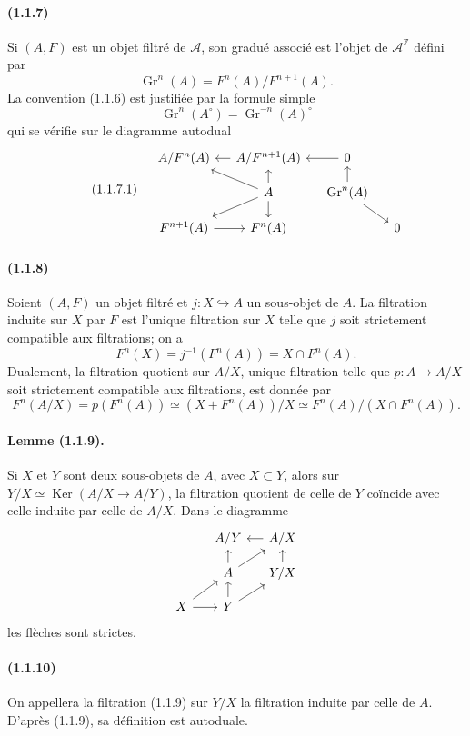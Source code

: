 \documentclass[10pt]{article}
\newcommand{\Z}{\mathbb Z}
\newcommand{\Gr}{\operatorname{Gr}}
\newcommand{\Ker}{\operatorname{Ker}}
\newcommand{\calA}{\mathcal A}
\begin{document}
\paragraph{(1.1.7)} Si $(A,F)$ est un objet filtré de $\calA$, son gradué associé est l'objet de $\calA^{\Z}$ défini par
\[
\Gr^n(A)=F^n(A)/F^{n+1}(A).
\]
La convention (1.1.6) est justifiée par la formule simple
\[
\Gr^n(A^{\circ})=\Gr^{-n}(A)^{\circ}
\]
qui se vérifie sur le diagramme autodual
\begin{equation}\tag{1.1.7.1}
\begin{tikzcd}[column sep=1.2em,row sep=1.0em]
& A/F^n(A) & A/F^{n+1}(A) \arrow[l] & 0 \arrow[l] \\
& & A \arrow[ul] \arrow[u] \arrow[dl] \arrow[d] & \Gr^n(A) \arrow[u] \arrow[dr] \\
& F^{n+1}(A) \arrow[r] & F^n(A) & & 0
\end{tikzcd}
\end{equation}

\paragraph{(1.1.8)} Soient $(A,F)$ un objet filtré et $j:X\hookrightarrow A$ un sous-objet de $A$. La filtration induite sur $X$ par $F$ est l'unique filtration sur $X$ telle que $j$ soit strictement compatible aux filtrations; on a
\[
F^n(X)=j^{-1}(F^n(A))=X\cap F^n(A).
\]
Dualement, la filtration quotient sur $A/X$, unique filtration telle que $p:A\to A/X$ soit strictement compatible aux filtrations, est donnée par
\[
F^n(A/X)=p(F^n(A))\simeq (X+F^n(A))/X\simeq F^n(A)/(X\cap F^n(A)).
\]

\paragraph{Lemme (1.1.9).} Si $X$ et $Y$ sont deux sous-objets de $A$, avec $X\subset Y$, alors sur $Y/X\simeq\Ker(A/X\to A/Y)$, la filtration quotient de celle de $Y$ coïncide avec celle induite par celle de $A/X$. Dans le diagramme
\[
\begin{tikzcd}[column sep=1.3em,row sep=1.0em]
& A/Y & A/X \arrow[l] \\
& A \arrow[u] \arrow[ur] & Y/X \arrow[u] \\
X \arrow[ur] \arrow[r] & Y \arrow[u] \arrow[ur] &
\end{tikzcd}
\]
les flèches sont strictes.

\paragraph{(1.1.10)} On appellera la filtration (1.1.9) sur $Y/X$ la filtration induite par celle de $A$. D'après (1.1.9), sa définition est autoduale.
\end{document}
